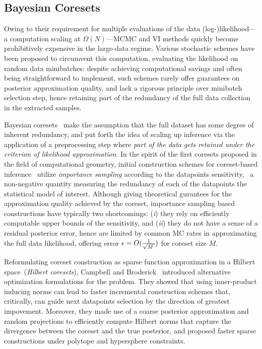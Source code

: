 \subsection{Bayesian Coresets}
\label{subsec:b-coresets}
Owing to their requirement for multiple evaluations of the data (log-)likelihood---a computation scaling at $\Omega(N)$---MCMC and VI methods quickly become prohibitively expensive in the large-data regime. Various stochastic schemes have been proposed to circumvent this computation, evaluating the likelihood on random data minibatches: despite achieving computational savings and often being straightforward to implement, such schemes rarely offer guarantees on posterior approximation quality, and lack a rigorous principle over minibatch selection step, hence retaining part of the redundancy of the full data collection in the extracted samples.

Bayesian coresets~\citep{huggins16,campbell18,campbell19jmlr,campbell19neurips} make the assumption that the full dataset has some degree of inherent redundancy, and put forth the idea of scaling up inference via the application of a preprocessing step where \emph{part of the data gets retained under the criterion of likelihood approximation}. In the spirit of the first coresets proposed in the field of computational geometry, initial construction schemes for coreset-based inference~\citep{huggins16,lucic17training} utilize \emph{importance sampling} according to the datapoints sensitivity, \ie~a non-negative quantity measuring the redundancy of each of the datapoints \wrt the statistical model of interest. Although giving theoretical gurantees for the approximation quality achieved by the coreset, importance sampling based constructions have typically two shortcomings: (\emph{i}) they rely on efficiently computable upper bounds of the sensitivity, and (\emph{ii}) they do not have a sense of a residual posterior error, hence are limited by common MC rates in approximating the full data likelihood, offering error $\eps = O(\frac{1}{\sqrt{M}})$ for coreset size $M$.

Reformulating coreset construction as sparse function approximation in a Hilbert space~(\emph{Hilbert coresets}), Campbell and Broderick~\citep{campbell18,campbell19jmlr} introduced alternative optimization formulations for the problem. They showed that using inner-product inducing norms can lead to faster incremental construction schemes that, critically, can guide next datapoints selection by the direction of greatest impovement. Moreover, they made use of a coarse posterior approximation and random projections to efficiently compute Hilbert norms that capture the divergence between the coreset and the true posterior, and proposed faster sparse constructions under polytope and hypersphere constraints.

